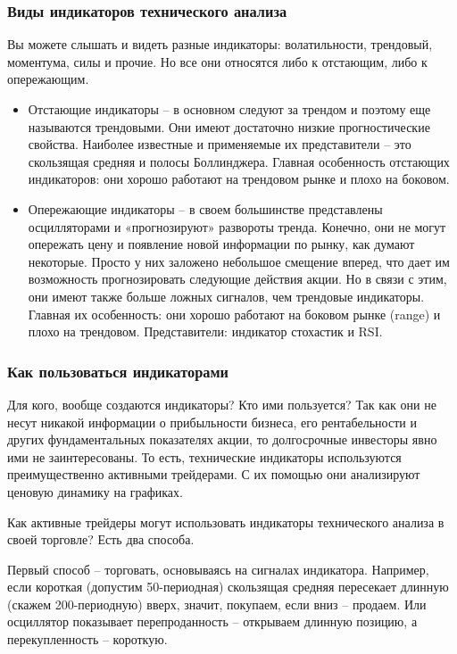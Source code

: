\documentclass[a5paper]{article}
\begin{document}
\subsubsection{Виды индикаторов технического анализа}

Вы можете слышать и видеть разные индикаторы: волатильности, трендовый, моментума, силы и прочие. Но все они относятся либо к отстающим, либо к опережающим.
\begin{itemize}
\item     Отстающие индикаторы – в основном следуют за трендом и поэтому еще называются трендовыми. Они имеют достаточно низкие прогностические свойства. Наиболее известные и применяемые их представители – это скользящая средняя и полосы Боллинджера. Главная особенность отстающих индикаторов: они хорошо работают на трендовом рынке и плохо на боковом.
\item     Опережающие индикаторы – в своем большинстве представлены осцилляторами и «прогнозируют» развороты тренда. Конечно, они не могут опережать цену и появление новой информации по рынку, как думают некоторые. Просто у них заложено небольшое смещение вперед, что дает им возможность прогнозировать следующие действия акции. Но в связи с этим, они имеют также больше ложных сигналов, чем трендовые индикаторы. Главная их особенность: они хорошо работают на боковом рынке (range) и плохо на трендовом. Представители: индикатор стохастик и RSI.
\end{itemize}

\subsubsection{Как пользоваться индикаторами}

Для кого, вообще создаются индикаторы? Кто ими пользуется? Так как они не несут никакой информации о прибыльности бизнеса, его рентабельности и других фундаментальных показателях акции, то долгосрочные инвесторы явно ими не заинтересованы. То есть, технические индикаторы используются преимущественно активными трейдерами. С их помощью они анализируют ценовую динамику на графиках.

Как активные трейдеры могут использовать индикаторы технического анализа в своей торговле? Есть два способа.

Первый способ – торговать, основываясь на сигналах индикатора. Например, если короткая (допустим 50-периодная) скользящая средняя пересекает длинную (скажем 200-периодную) вверх, значит, покупаем, если вниз – продаем. Или осциллятор показывает перепроданность – открываем длинную позицию, а перекупленность – короткую.
\end{document}
